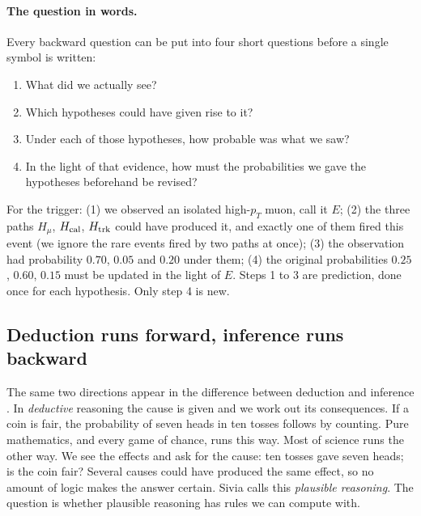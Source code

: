 \paragraph{The question in words.}
Every backward question can be put into four short questions before a single
symbol is written:
\begin{enumerate}[itemsep=1pt]
  \item What did we actually see?
  \item Which hypotheses could have given rise to it?
  \item Under each of those hypotheses, how probable was what we saw?
  \item In the light of that evidence, how must the probabilities we gave the
        hypotheses beforehand be revised?
\end{enumerate}
For the trigger: (1) we observed an isolated high-$p_T$ muon, call it $E$;
(2) the three paths $H_\mu$, $H_{\rm cal}$, $H_{\rm trk}$ could have produced
it, and exactly one of them fired this event (we ignore the rare events fired
by two paths at once); (3) the observation had probability $0.70$, $0.05$ and
$0.20$ under them; (4) the original probabilities $0.25$, $0.60$, $0.15$ must
be updated in the light of $E$.
Steps 1 to 3 are prediction, done once for each hypothesis. Only step 4 is new.

\subsection{Deduction runs forward, inference runs backward}

The same two directions appear in the difference between deduction and
inference . In \emph{deductive} reasoning the
cause is given and we work out its consequences. If a coin is fair, the
probability of seven heads in ten tosses follows by counting. Pure mathematics,
and every game of chance, runs this way. Most of science runs the other way. We
see the effects and ask for the cause: ten tosses gave seven heads; is the coin
fair? Several causes could have produced the same effect, so no amount of logic
makes the answer certain. Sivia calls this \emph{plausible reasoning}. The
question is whether plausible reasoning has rules we can compute with.

